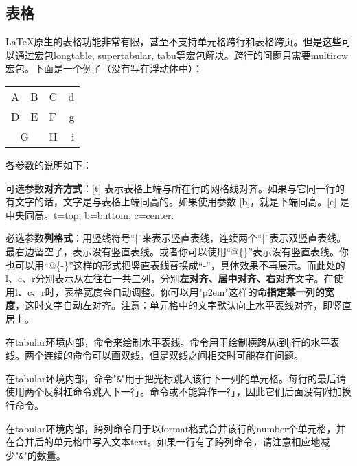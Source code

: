 {\subsection{表格}
\LaTeX 原生的表格功能非常有限，甚至不支持单元格跨行和表格跨页。但是这些可以通过宏包longtable, supertabular, tabu等宏包解决。跨行的问题只需要multirow宏包。下面是一个例子（没有写在浮动体中）：

\begin{codeshow}
\begin{center}
  \begin{tabular}[c]{|l|c||p{3em}
    r@{-}} \hline\hline
    A & B & C & d\\D & E & F & g\\
    \cline{1-2}
    \multicolumn{2}{|c|}{G}&H&i\\
    \hline
  \end{tabular}
\end{center}
\end{codeshow}

各参数的说明如下：
\begin{feai}
\item 可选参数\textbf{对齐方式}：[t] 表示表格上端与所在行的网格线对齐。如果与它同一行的有文字的话，文字是与表格上端同高的。如果使用参数 [b]，就是下端同高。[c] 是中央同高。t=top, b=buttom, c=center.
\item 必选参数\textbf{列格式}：用竖线符号“|”来表示竖直表线，连续两个“|”表示双竖直表线。最右边留空了，表示没有竖直表线。或者你可以使用“@\{\}”表示没有竖直表线。你也可以用“@\{-\}”这样的形式把竖直表线替换成“-”，具体效果不再展示。而此处的l、c、r分别表示从左往右一共三列，分别\textbf{左对齐、居中对齐、右对齐}文字。在使用l、c、r时，表格宽度会自动调整。你可以用"p{2em}"这样的命\textbf{指定某一列的宽度}，这时文字自动左对齐。注意：单元格中的文字默认向上水平表线对齐，即竖直居上。
\item 在tabular环境内部，命令\latexline{\\hline}来绘制水平表线。命令用于绘制横跨从i到j行的水平表线。两个连续的\latexline{\\hline}命令可以画双线，但是双线之间相交时可能存在问题。
\item 在tabular环境内部，命令"\texttt{\&}"用于把光标跳入该行下一列的单元格。每行的最后请使用两个反斜杠命令跳入下一行。命令\latexline{\\hline}或\latexline{\\cline}不能算作一行，因此它们后面没有附加换行命令。
\item 在tabular环境内部，跨列命令用于以format格式合并该行的number个单元格，并在合并后的单元格中写入文本text。如果一行有了跨列命令，请注意相应地减少"\texttt{\&}"的数量。
\end{feai}

}
